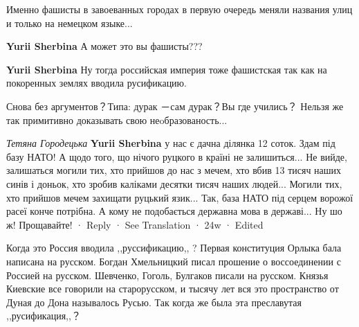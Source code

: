 \begin{itemize}
\begin{itemize}
Именно фашисты в завоеванных городах в первую очередь меняли названия улиц и только на немецком языке...

\textbf{Yurii Sherbina} А может это вы фашисты???

\textbf{Yurii Sherbina} Ну тогда российская империя тоже фашистская так как на покоренных землях вводила русификацию.

Снова без аргументов？Типа: дурак －сам дурак？Вы где учились？
Нельзя же так примитивно доказывать свою неoбразованость...

\emph{Тетяна Городецька}
\textbf{Yurii Sherbina} у нас є дачна ділянка 12 соток. Здам під базу НАТО!
А щодо того, що нічого руцкого в країні не залишиться... Не вийде, залишаться могили тих, хто прийшов до нас з мечем, хто вбив 13 тисяч наших синів і доньок, хто зробив каліками десятки тисяч наших людей...
Могили тих, хто прийшов мечем захищати руцький язик...
Так, база НАТО під серцем ворожої расеї конче потрібна. А кому не подобається державна мова в державі... Ну шо ж! Прощавайте!
 · Reply · See Translation · 24w · Edited

Когда это Россия вводила ,,руссификацию,, ?
Первая конституция Орлыка бала написана на русском.
Богдан Хмельницкий писал прошение о воссоединении с Россией на русском. Шевченко, Гоголь, Булгаков писали на русском.
Князья Киевские все говорили на старорусском, и тысячу лет вся это пространство от Дуная до Дона называлось Русью.
Так когда же была эта преславутая ,,русификация,,？

\end{itemize}
\end{itemize}

